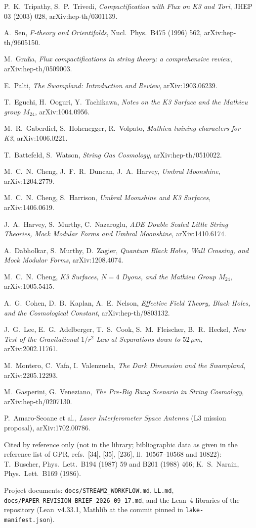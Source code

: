 \begin{description}[leftmargin=2.2cm,style=nextline,font=\normalfont\sffamily\bfseries]
\item[TT] P.~K.~Tripathy, S.~P.~Trivedi, \emph{Compactification with Flux on K3 and Tori}, JHEP 03 (2003) 028, arXiv:hep-th/0301139.
\item[Sen] A.~Sen, \emph{F-theory and Orientifolds}, Nucl.\ Phys.\ B475 (1996) 562, arXiv:hep-th/9605150.
\item[Gra] M.~Gra\~na, \emph{Flux compactifications in string theory: a comprehensive review}, arXiv:hep-th/0509003.
\item[Pal] E.~Palti, \emph{The Swampland: Introduction and Review}, arXiv:1903.06239.
\item[EOT] T.~Eguchi, H.~Ooguri, Y.~Tachikawa, \emph{Notes on the K3 Surface and the Mathieu group $M_{24}$}, arXiv:1004.0956.
\item[GHV] M.~R.~Gaberdiel, S.~Hohenegger, R.~Volpato, \emph{Mathieu twining characters for K3}, arXiv:1006.0221.
\item[BW] T.~Battefeld, S.~Watson, \emph{String Gas Cosmology}, arXiv:hep-th/0510022.
\item[CDH] M.~C.~N.~Cheng, J.~F.~R.~Duncan, J.~A.~Harvey, \emph{Umbral Moonshine}, arXiv:1204.2779.
\item[CH] M.~C.~N.~Cheng, S.~Harrison, \emph{Umbral Moonshine and K3 Surfaces}, arXiv:1406.0619.
\item[HMN] J.~A.~Harvey, S.~Murthy, C.~Nazaroglu, \emph{ADE Double Scaled Little String Theories, Mock Modular Forms and Umbral Moonshine}, arXiv:1410.6174.
\item[DMZ] A.~Dabholkar, S.~Murthy, D.~Zagier, \emph{Quantum Black Holes, Wall Crossing, and Mock Modular Forms}, arXiv:1208.4074.
\item[Cheng] M.~C.~N.~Cheng, \emph{K3 Surfaces, $N=4$ Dyons, and the Mathieu Group $M_{24}$}, arXiv:1005.5415.
\item[CKN] A.~G.~Cohen, D.~B.~Kaplan, A.~E.~Nelson, \emph{Effective Field Theory, Black Holes, and the Cosmological Constant}, arXiv:hep-th/9803132.
\item[EW] J.~G.~Lee, E.~G.~Adelberger, T.~S.~Cook, S.~M.~Fleischer, B.~R.~Heckel, \emph{New Test of the Gravitational $1/r^2$ Law at Separations down to $52\,\mu$m}, arXiv:2002.11761.
\item[MVV] M.~Montero, C.~Vafa, I.~Valenzuela, \emph{The Dark Dimension and the Swampland}, arXiv:2205.12293.
\item[GV] M.~Gasperini, G.~Veneziano, \emph{The Pre-Big Bang Scenario in String Cosmology}, arXiv:hep-th/0207130.
\item[LISA] P.~Amaro-Seoane et al., \emph{Laser Interferometer Space Antenna} (L3 mission proposal), arXiv:1702.00786.
\end{description}
\noindent Cited by reference only (not in the library; bibliographic data as given in the reference list
of GPR, refs.~[34], [35], [236], ll.~10567--10568 and 10822): T.~Buscher, Phys.\ Lett.\ B194 (1987) 59 and
B201 (1988) 466; K.~S.~Narain, Phys.\ Lett.\ B169 (1986).

\medskip\noindent Project documents: \texttt{docs/STREAM2\_WORKFLOW.md}, \texttt{LL.md},
\texttt{docs/PAPER\_REVISION\_BRIEF\_2026\_09\_17.md}, and the Lean~4 libraries of the repository
(Lean~v4.33.1, Mathlib at the commit pinned in \texttt{lake-manifest.json}).
